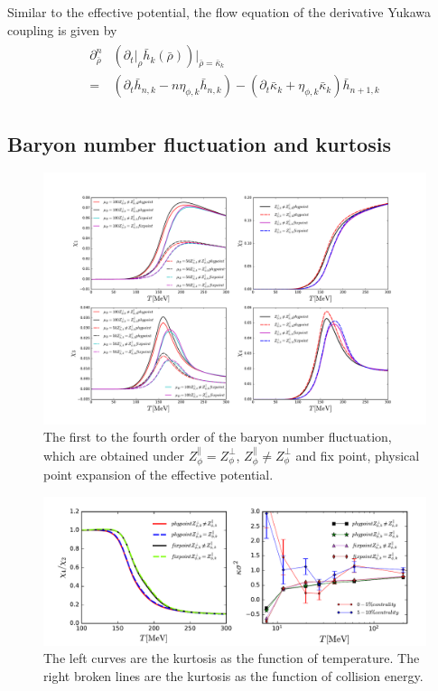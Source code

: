 \documentclass[%
reprint,
superscriptaddress,
showpacs,preprintnumbers,
 amsmath,amssymb,
 aps,
prd,
]{revtex4-1}
\begin{document}
Similar to the effective potential, the flow equation of the derivative Yukawa coupling is given by
\begin{align}\label{}
\begin{split}
\partial^{n}_{\bar{\rho}}&(\partial_t\big|_{\rho}\bar{h}_k(\bar{\rho}))\bigg|_{\bar{\rho}=\bar{\kappa}_k} \\
=&(\partial_t\bar{h}_{n,k}-n\eta_{\phi,k}\bar{h}_{n,k})-(\partial_t\bar{\kappa}_k+\eta_{\phi,k}\bar{\kappa}_k)\bar{h}_{n+1,k}
\end{split}
\end{align} 


\subsection{Baryon number fluctuation and kurtosis}
\begin{figure}[t]
\label{fig:4chi}
\includegraphics[width=1.0\textwidth]{4chi.pdf}
\caption{The first to the fourth order of the baryon number fluctuation, which are obtained under $Z^{\|}_{\phi}=Z^{\bot}_{\phi}$, $Z^{\|}_{\phi}\neq Z^{\bot}_{\phi}$ 
and fix point, physical point expansion of the effective potential. }
\end{figure}

\begin{figure}[t]
\includegraphics[width=1.0\textwidth]{kur.pdf}
\caption{The left curves are the kurtosis as the function of temperature. The right broken lines are the kurtosis as the function of collision energy.}
\label{fig:r42}
\end{figure}
\end{document}
